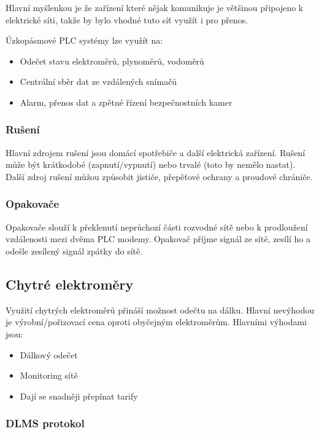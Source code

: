 Hlavní myšlenkou je že zařízení které nějak komunikuje je většinou připojeno k elektrické síti, takže by bylo vhodné tuto síť využít i pro přenos.

Úzkopásmové PLC systémy lze využít na:
\begin{itemize}
    \item Odečet stavu elektroměrů, plynoměrů, vodoměrů
    \item Centrální sběr dat ze vzdálených snímačů
    \item Alarm, přenos dat a zpětné řízení bezpečnostních kamer
\end{itemize}

\subsubsection{Rušení}

Hlavní zdrojem rušení jsou domácí spotřebiče a další elektrická zařízení.
Rušení může být krátkodobé (zapnutí/vypnutí) nebo trvalé (toto by nemělo nastat).
Další zdroj rušení můžou způsobit jističe, přepěťové ochrany a proudové chrániče. 

\subsubsection{Opakovače}

Opakovače slouží k překlenutí neprůchozí části rozvodné sítě nebo k prodloužení vzdálenosti mezi dvěma PLC modemy.
Opakovač příjme signál ze sítě, zesílí ho a odešle zesílený signál zpátky do sítě.

\subsection{Chytré elektroměry}

Využití chytrých elektroměrů přináší možnost odečtu na dálku.
Hlavní nevýhodou je výrobní/pořizovací cena oproti obyčejným elektroměrům.
Hlavními výhodami jsou:

\begin{itemize}
    \item Dálkový odečet
    \item Monitoring sítě
    \item Dají se snadněji přepínat tarify
\end{itemize}


\subsubsection{DLMS protokol}


